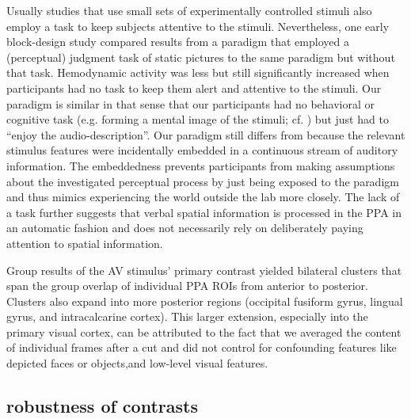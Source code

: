 \documentclass[english]{article}
\begin{document}
Usually studies that use small sets of experimentally controlled stimuli also
employ a task to keep subjects attentive to the stimuli.
Nevertheless, one early block-design study \citep{epstein1998ppa} compared
results from a paradigm that employed a (perceptual) judgment task of static
pictures to the same paradigm but without that task.
Hemodynamic activity was less but still significantly increased when
participants had no task to keep them alert and attentive to the stimuli.
Our paradigm is similar in that sense that our participants had no behavioral or
cognitive task (e.g. forming a mental image of the stimuli; cf.
\citep{ocraven2000mental})  but just had to ``enjoy the audio-description''.
Our paradigm still differs from \citep{epstein1998ppa} because the relevant
stimulus features were incidentally embedded in a continuous stream of auditory
information.
The embeddedness prevents participants from making assumptions about the
investigated perceptual process by just being exposed to the paradigm and thus
mimics experiencing the world outside the lab more closely.
The lack of a task further suggests that verbal spatial information is processed
in the PPA in an automatic fashion and does not necessarily rely on deliberately
paying attention to spatial information.

Group results of the AV stimulus' primary contrast yielded bilateral clusters
that span the group overlap of individual PPA ROIs from anterior to posterior.
Clusters also expand into more posterior regions (occipital fusiform gyrus,
lingual gyrus, and intracalcarine cortex).
This larger extension, especially into the primary visual cortex, can be
attributed to the fact that we averaged the content of individual frames after a
cut and did not control for confounding features like depicted faces or
objects,and low-level visual features.


\subsection{robustness of contrasts}
\end{document}
